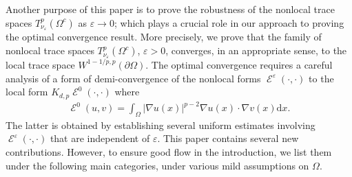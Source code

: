 \documentclass[12pt, reqno]{amsart}%
\theoremstyle{plain}  %
\theoremstyle{definition}  %
\numberwithin{equation}{section}
\DeclareMathOperator{\cE}{\mathcal{E}}
\renewcommand{\d}{\mathrm{d}}
\newcommand{\eps}{\varepsilon}
\newcommand{\TnuOma}{T^p_{\nu_\eps} (\Omega^c)}
\begin{document}
Another purpose of this paper is to prove the robustness of the nonlocal trace spaces $\TnuOma$ as $\eps \to 0$; which plays a crucial role in our approach to proving the optimal convergence result. More precisely, we prove that the family of nonlocal trace spaces $\TnuOma$, $\eps>0$, converges, in an appropriate sense, to the local trace space $W^{1-1/p,p}(\partial\Omega)$. The optimal convergence requires a careful analysis of a form of demi-convergence of the nonlocal forms $\cE^\eps(\cdot,\cdot)$ to the local form $K_{d,p}\cE^0(\cdot,\cdot)$ where
\begin{align*}
\cE^0(u,v)=\int_\Omega |\nabla u(x)|^{p-2}\nabla u(x)\cdot \nabla v(x)\d x.
\end{align*}
The latter is obtained by establishing several uniform estimates involving $\cE^\eps(\cdot,\cdot)$ that are independent of $\eps$.
This paper contains several new contributions. However, to ensure good flow in the introduction, we list them under the following main categories, under various mild assumptions on $\Omega$.
\end{document}
